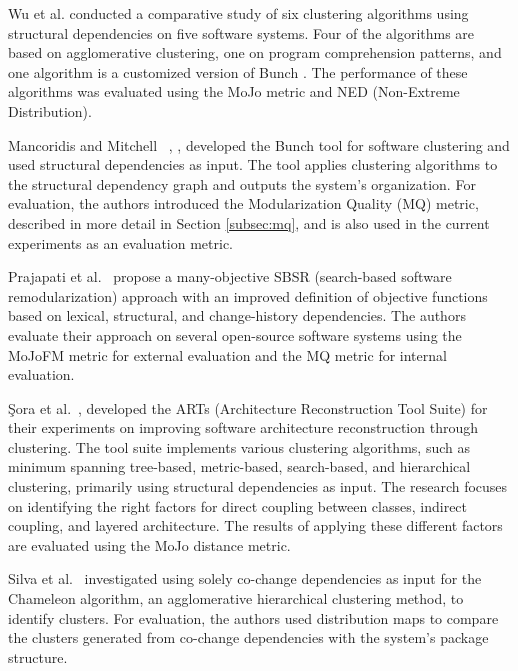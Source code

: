 Wu et al. \cite{wu} conducted a comparative study of six clustering algorithms using structural dependencies on five software systems. Four of the algorithms are based on agglomerative clustering, one on program comprehension patterns, and one algorithm is a customized version of Bunch \cite{b10}. The performance of these algorithms was evaluated using the MoJo metric and NED (Non-Extreme Distribution).

Mancoridis and Mitchell ~\cite{b10}, \cite{b2}, \cite{bunch} developed the Bunch tool for software clustering and used structural dependencies as input. The tool applies clustering algorithms to the structural dependency graph and outputs the system's organization. For evaluation, the authors introduced the Modularization Quality (MQ) metric, described in more detail in Section \ref{subsec:mq}, and is also used in the current experiments as an evaluation metric.


Prajapati et al.~\cite{b18} propose a many-objective SBSR (search-based software remodularization) approach with an improved definition of objective functions based on lexical, structural, and change-history dependencies. The authors evaluate their approach on several open-source software systems using the MoJoFM metric for external evaluation and the MQ metric for internal evaluation.

Şora et al.~\cite{SoraSem13}, \cite{SoraConti} developed the ARTs (Architecture Reconstruction Tool Suite) for their experiments on improving software architecture reconstruction through clustering. The tool suite implements various clustering algorithms, such as minimum spanning tree-based, metric-based, search-based, and hierarchical clustering, primarily using structural dependencies as input. The research focuses on identifying the right factors for direct coupling between classes, indirect coupling, and layered architecture. The results of applying these different factors are evaluated using the MoJo distance metric.

Silva et al.~\cite{b16} investigated using solely co-change dependencies as input for the Chameleon algorithm, an agglomerative hierarchical clustering method, to identify clusters. For evaluation, the authors used distribution maps to compare the clusters generated from co-change dependencies with the system's package structure.


